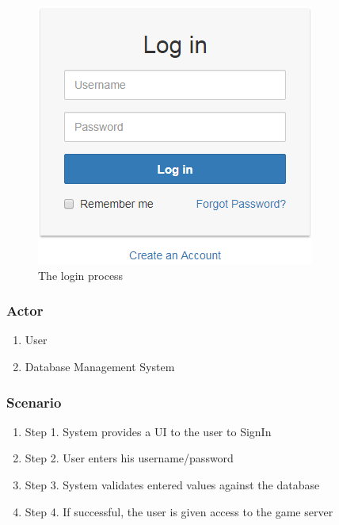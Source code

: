 \documentclass{article}
\begin{document}
\begin{figure}[h!]
\centering
\includegraphics[scale=0.5]{login}
\caption{The login process}
\label{fig:login}
\end{figure}

\subsubsection{Actor}

\begin{enumerate}
    \item  User
    \item  Database Management System

\end{enumerate}
\subsubsection{Scenario}

\begin{enumerate}

    \item  Step 1. System provides a UI to the user to SignIn 
    \item  Step 2. User enters his username/password
    \item  Step 3. System validates entered values against the database
    \item  Step 4. If successful, the user is given access to the game server

\end{enumerate}
\end{document}
